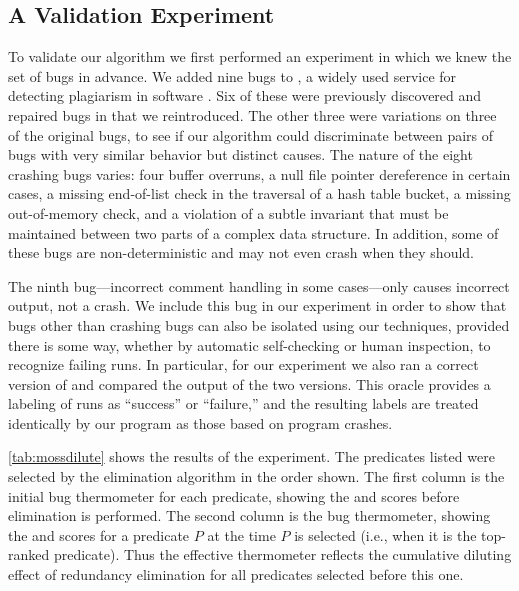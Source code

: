 \subsection{A Validation Experiment}

To validate our algorithm we first performed an experiment in which we
knew the set of bugs in advance.  We added nine bugs to \moss, a
widely used service for detecting plagiarism in software
\cite{Schleimer:2003:WLA}.  Six of these were previously discovered
and repaired bugs in \moss that we reintroduced.  The other three were
variations on three of the original bugs, to see if our algorithm could
discriminate between pairs of bugs with very similar behavior but
distinct causes.  The nature of the eight crashing bugs varies: four
buffer overruns, a null file pointer dereference in certain cases, a
missing end-of-list check in the traversal of a hash table bucket, a missing
out-of-memory check, and a violation of a subtle invariant that must be maintained between two
parts of a complex data structure.  In addition, some of these bugs
are non-deterministic and may not even crash when they should.

The ninth bug---incorrect comment handling in some cases---only
causes incorrect output, not a crash.  We include this bug in our
experiment in order to show that bugs other than crashing bugs can 
also be isolated using our techniques, provided there is some 
way, whether by automatic self-checking or human inspection, to recognize
failing runs.  In particular, for our experiment we also ran a correct 
version of \moss{} and compared the output of the two versions. 
This oracle provides a labeling of runs as ``success'' or ``failure,'' 
and the resulting labels are treated identically by our program as
those based on program crashes.



\autoref{tab:mossdilute} shows the results of the experiment.  The
predicates listed were selected by the elimination algorithm in the
order shown.  The first column is the initial bug thermometer for each
predicate, showing the \context{} and \increase{} scores before
elimination is performed. The second column is the 
bug thermometer, showing the \context{} and \increase{} scores for a
predicate $P$ at the time $P$ is selected (i.e., when it is the
top-ranked predicate).  Thus the effective thermometer reflects the
cumulative diluting effect of redundancy elimination for all
predicates selected before this one.

